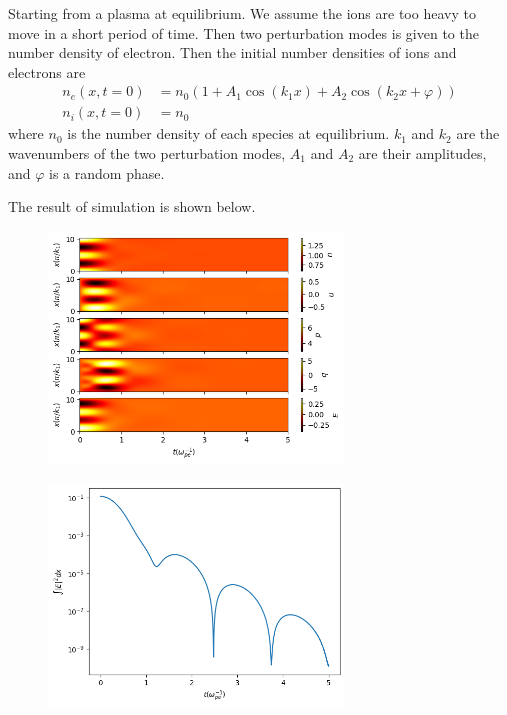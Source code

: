 \documentclass{article}
\begin{document}
    Starting from a plasma at equilibrium. We assume the ions are too heavy to move in a short period of time. Then two perturbation modes is given to the number density of electron. Then the initial number densities of ions and electrons are
    \begin{align} \label{eq:initial_conditions}
        n_e(x,t=0) &= n_0(1 + A_1\cos (k_1x) + A_2\cos (k_2x + \varphi)) \\
        n_i(x,t=0) &= n_0
    \end{align}
    where $n_0$ is the number density of each species at equilibrium. $k_1$ and $k_2$ are the wavenumbers of the two perturbation modes, $A_1$ and $A_2$ are their amplitudes, and $\varphi$ is a random phase.

    The result of simulation is shown below.

    \begin{figure} [H]
        \centering
        \includegraphics[width=0.7\textwidth]{img/simulation_fields.png}
        \label{fig:simulation_fields}
    \end{figure}

    \begin{figure} [H]
        \centering
        \includegraphics[width=0.7\textwidth]{img/simulation_energy.png}
        \label{fig:simulation_energy}
    \end{figure}
\end{document}
